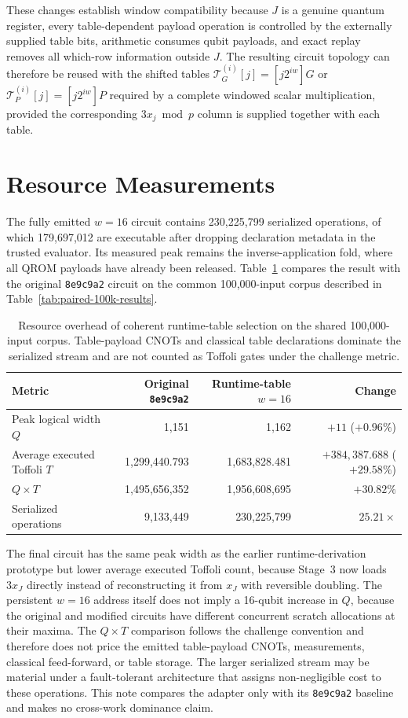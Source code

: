 \documentclass[10pt]{article}
\begin{document}
These changes establish window compatibility because $J$ is a genuine quantum register, every table-dependent payload operation is controlled by the externally supplied table bits, arithmetic consumes qubit payloads, and exact replay removes all which-row information outside $J$. The resulting circuit topology can therefore be reused with the shifted tables $\mathcal T_G^{(i)}[j]=[j2^{iw}]G$ or $\mathcal T_P^{(i)}[j]=[j2^{iw}]P$ required by a complete windowed scalar multiplication, provided the corresponding $3x_j\bmod p$ column is supplied together with each table.

\section{Resource Measurements}

The fully emitted $w=16$ circuit contains 230,225,799 serialized operations, of which 179,697,012 are executable after dropping declaration metadata in the trusted evaluator. Its measured peak remains the inverse-application fold, where all QROM payloads have already been released. Table~\ref{tab:resources} compares the result with the original \texttt{8e9c9a2} circuit on the common 100,000-input corpus described in Table~\ref{tab:paired-100k-results}.

\begin{table}[ht]
\centering
\small
\begin{tabular}{@{}lrrr@{}}
\toprule
Metric & Original \texttt{8e9c9a2} & Runtime-table $w=16$ & Change \\
\midrule
Peak logical width $Q$ & 1,151 & 1,162 & $+11$ ($+0.96\%$) \\
Average executed Toffoli $T$ & 1,299,440.793 & 1,683,828.481 & $+384,387.688$ ($+29.58\%$) \\
$Q\times T$ & 1,495,656,352 & 1,956,608,695 & $+30.82\%$ \\
Serialized operations & 9,133,449 & 230,225,799 & $25.21\times$ \\
\bottomrule
\end{tabular}
\caption{Resource overhead of coherent runtime-table selection on the shared 100,000-input corpus. Table-payload CNOTs and classical table declarations dominate the serialized stream and are not counted as Toffoli gates under the challenge metric.}
\label{tab:resources}
\end{table}

The final circuit has the same peak width as the earlier runtime-derivation prototype but lower average executed Toffoli count, because Stage~3 now loads $3x_J$ directly instead of reconstructing it from $x_J$ with reversible doubling. The persistent $w=16$ address itself does not imply a 16-qubit increase in $Q$, because the original and modified circuits have different concurrent scratch allocations at their maxima. The $Q\times T$ comparison follows the challenge convention and therefore does not price the emitted table-payload CNOTs, measurements, classical feed-forward, or table storage. The larger serialized stream may be material under a fault-tolerant architecture that assigns non-negligible cost to these operations. This note compares the adapter only with its \texttt{8e9c9a2} baseline and makes no cross-work dominance claim.
\end{document}
